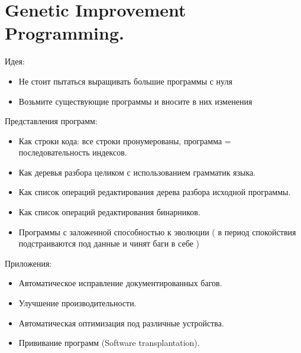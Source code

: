 \section{Genetic Improvement Programming.}

Идея:
\begin{itemize}
    \item Не стоит пытаться выращивать большие программы с нуля
    \item Возьмите существующие программы и вносите в них изменения
\end{itemize}

Представления программ:
\begin{itemize}
    \item Как строки кода: все строки пронумерованы, программа =
    последовательность индексов.
    \item Как деревья разбора целиком с использованием грамматик
    языка.
    \item Как список операций редактирования дерева разбора
    исходной программы.
    \item Как список операций редактирования бинарников.
    \item Программы с заложенной способностью к эволюции (
        в период спокойствия подстраиваются под данные и чинят
        баги в себе
    )
\end{itemize}

Приложения:
\begin{itemize}
    \item Автоматическое исправление документированных багов.
    \item Улучшение производительности.
    \item Автоматическая оптимизация под различные устройства.
    \item Прививание программ (Software transplantation).
\end{itemize}
